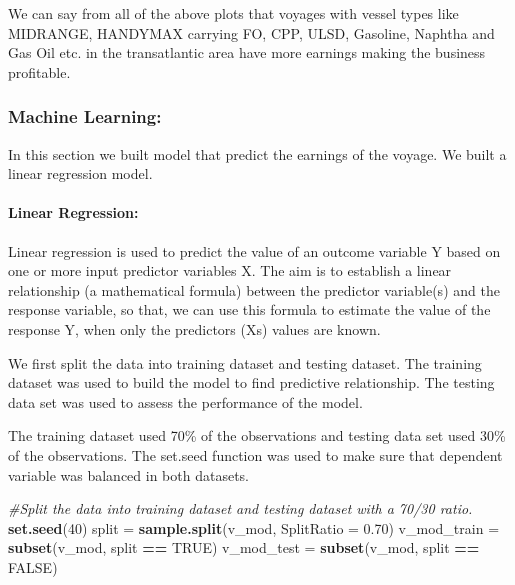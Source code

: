 \documentclass[]{article}
\newenvironment{Shaded}{\begin{snugshade}}{\end{snugshade}}
\newcommand{\KeywordTok}[1]{\textcolor[rgb]{0.13,0.29,0.53}{\textbf{#1}}}
\newcommand{\DataTypeTok}[1]{\textcolor[rgb]{0.13,0.29,0.53}{#1}}
\newcommand{\DecValTok}[1]{\textcolor[rgb]{0.00,0.00,0.81}{#1}}
\newcommand{\FloatTok}[1]{\textcolor[rgb]{0.00,0.00,0.81}{#1}}
\newcommand{\StringTok}[1]{\textcolor[rgb]{0.31,0.60,0.02}{#1}}
\newcommand{\CommentTok}[1]{\textcolor[rgb]{0.56,0.35,0.01}{\textit{#1}}}
\newcommand{\OtherTok}[1]{\textcolor[rgb]{0.56,0.35,0.01}{#1}}
\newcommand{\OperatorTok}[1]{\textcolor[rgb]{0.81,0.36,0.00}{\textbf{#1}}}
\newcommand{\NormalTok}[1]{#1}
\let\oldparagraph\paragraph
\renewcommand{\paragraph}[1]{\oldparagraph{#1}\mbox{}}
\begin{document}
We can say from all of the above plots that voyages with vessel types
like MIDRANGE, HANDYMAX carrying FO, CPP, ULSD, Gasoline, Naphtha and
Gas Oil etc. in the transatlantic area have more earnings making the
business profitable.

\subsubsection{\texorpdfstring{\textbf{Machine
Learning:}}{Machine Learning:}}\label{machine-learning}

In this section we built model that predict the earnings of the voyage.
We built a linear regression model.

\paragraph{\texorpdfstring{\textbf{Linear
Regression:}}{Linear Regression:}}\label{linear-regression}

Linear regression is used to predict the value of an outcome variable Y
based on one or more input predictor variables X. The aim is to
establish a linear relationship (a mathematical formula) between the
predictor variable(s) and the response variable, so that, we can use
this formula to estimate the value of the response Y, when only the
predictors (Xs) values are known.

We first split the data into training dataset and testing dataset. The
training dataset was used to build the model to find predictive
relationship. The testing data set was used to assess the performance of
the model.

The training dataset used 70\% of the observations and testing data set
used 30\% of the observations. The set.seed function was used to make
sure that dependent variable was balanced in both datasets.

\begin{Shaded}
\begin{Highlighting}[]
\CommentTok{#Split the data into training dataset and testing dataset with a 70/30 ratio.}
\KeywordTok{set.seed}\NormalTok{(}\DecValTok{40}\NormalTok{)}
\NormalTok{split =}\StringTok{ }\KeywordTok{sample.split}\NormalTok{(v_mod, }\DataTypeTok{SplitRatio =} \FloatTok{0.70}\NormalTok{)}
\NormalTok{v_mod_train =}\StringTok{ }\KeywordTok{subset}\NormalTok{(v_mod, split }\OperatorTok{==}\StringTok{ }\OtherTok{TRUE}\NormalTok{) }
\NormalTok{v_mod_test =}\StringTok{ }\KeywordTok{subset}\NormalTok{(v_mod, split }\OperatorTok{==}\StringTok{ }\OtherTok{FALSE}\NormalTok{)}
\end{Highlighting}
\end{Shaded}
\end{document}

